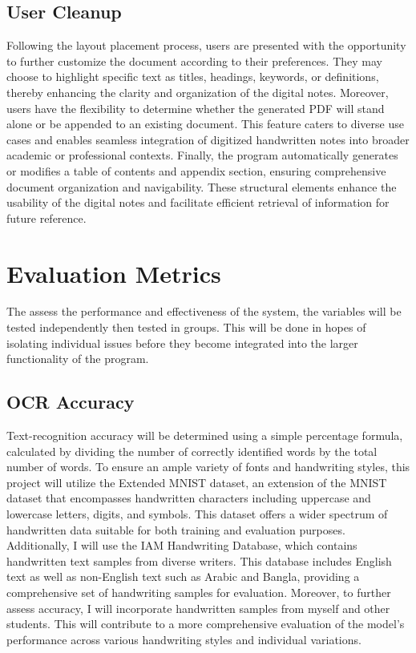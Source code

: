 \documentclass[10pt,twocolumn]{article}
\begin{document}
\subsection{User Cleanup}
Following the layout placement process, users are presented with the opportunity to further customize the document according to their preferences. They may choose to highlight specific text as titles, headings, keywords, or definitions, thereby enhancing the clarity and organization of the digital notes. Moreover, users have the flexibility to determine whether the generated PDF will stand alone or be appended to an existing document. This feature caters to diverse use cases and enables seamless integration of digitized handwritten notes into broader academic or professional contexts. Finally, the program automatically generates or modifies a table of contents and appendix section, ensuring comprehensive document organization and navigability. These structural elements enhance the usability of the digital notes and facilitate efficient retrieval of information for future reference.


\section{Evaluation Metrics}
The assess the performance and effectiveness of the system, the variables will be tested independently then tested in groups. This will be done in hopes of isolating individual issues before they become integrated into the larger functionality of the program. 

\subsection{OCR Accuracy}
Text-recognition accuracy will be determined using a simple percentage formula, calculated by dividing the number of correctly identified words by the total number of words. To ensure an ample variety of fonts and handwriting styles, this project will utilize the Extended MNIST dataset, an extension of the MNIST dataset that encompasses handwritten characters including uppercase and lowercase letters, digits, and symbols. This dataset offers a wider spectrum of handwritten data suitable for both training and evaluation purposes. Additionally, I  will use the IAM Handwriting Database, which contains handwritten text samples from diverse writers. This database includes English text as well as non-English text such as Arabic and Bangla, providing a comprehensive set of handwriting samples for evaluation. Moreover, to further assess accuracy, I will incorporate handwritten samples from myself and other students. This will contribute to a more comprehensive evaluation of the model's performance across various handwriting styles and individual variations.
\end{document}
